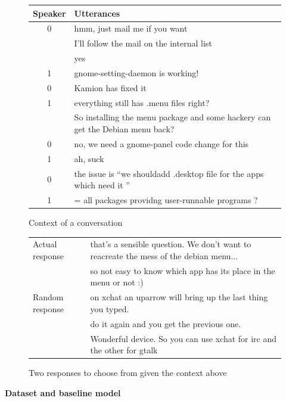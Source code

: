 \documentclass[11pt]{article}
\begin{document}
\begin{figure}
\begin{tabular}{| c | l |}
\hline
Speaker & Utterances \\ \hline
0 & hmm, just mail me if you want \\ 
 & I'll follow the mail on the internal list \\ 
 & yes \\ \hline
 1 & gnome-setting-daemon is working! \\ \hline
 0 & Kamion has fixed it \\ \hline
 1 & everything still has .menu files right? \\
 & So installing the menu package and some hackery can get the Debian menu back? \\ \hline
 0 & no, we need a gnome-panel code change for this \\ \hline
 1 & ah, suck \\ \hline
 0 & the issue is ``we shouldadd .desktop file for the apps which need it ''  \\ \hline
 1 & = all packages providng user-runnable programs ? \\ \hline
\end{tabular}
\caption{Context of a conversation}
\label{sample_context}
\vspace{5mm}
\end{figure}

\begin{figure}
\begin{tabular}{| l | l |}
\hline
Actual response & that's a sensible question. We don't want to reacreate the mess of the debian menu... \\
& so not easy to know which app has its place in the menu or not :) \\ \hline
Random response & on xchat an uparrow will bring up the last thing you typed. \\
 & do it again and you get the previous one. \\
 & Wonderful device. So you can use xchat for irc and the other for gtalk \\ \hline
\end{tabular}
\caption{Two responses to choose from given the context above}
\label{sample_response}
\end{figure}

\textbf{Dataset and baseline model}\\\\
\end{document}
